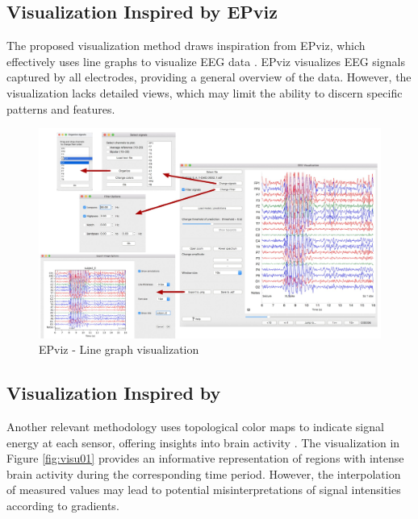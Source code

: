 \documentclass[format=sigconf]{acmart}
\begin{document}
		\subsection{Visualization Inspired by EPviz \cite{currey2023epviz}}
			\par The proposed visualization method draws inspiration from EPviz, which effectively uses line graphs to visualize EEG data \cite{currey2023epviz}. EPviz visualizes EEG signals captured by all electrodes, providing a general overview of the data. However, the visualization lacks detailed views, which may limit the ability to discern specific patterns and features.
		
			\begin{figure}[h]
				\centering
				\includegraphics[width=\linewidth]{../presentation/images/epviz00}
				\caption{EPviz - Line graph visualization}
				\label{fig:epviz00}
			\end{figure}
	
		\subsection{Visualization Inspired by \cite{9098189}}
			\par Another relevant methodology uses topological color maps to indicate signal energy at each sensor, offering insights into brain activity \cite{9098189}. The visualization in Figure \ref{fig:visu01} provides an informative representation of regions with intense brain activity during the corresponding time period. However, the interpolation of measured values may lead to potential misinterpretations of signal intensities according to gradients.
			
\end{document}
